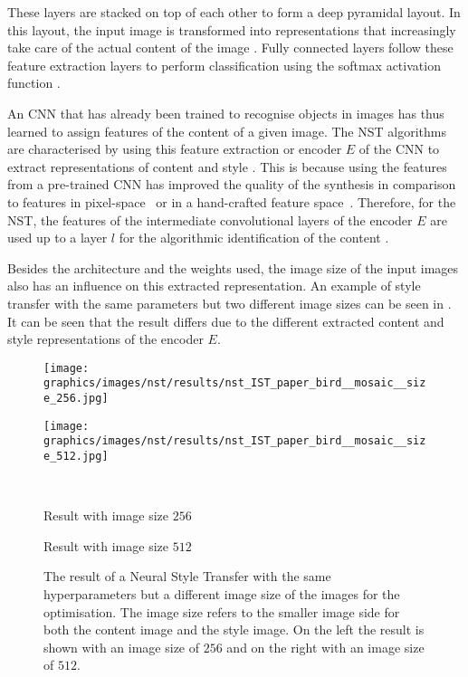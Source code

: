 These layers are stacked on top of each other to form a deep pyramidal layout. In this layout, the input image is transformed into representations that increasingly take care of the actual content of the image \cite{ZF2014}. Fully connected layers follow these feature extraction layers to perform classification using the softmax activation function \cite{Alp2020}. 

An \gls{CNN} that has already been trained to recognise objects in images has thus learned to assign features of the content of a given image. The \gls{NST} algorithms are characterised by using this feature extraction or encoder $E$ of the \gls{CNN} to extract representations of content and style \cite{Glas2021}. This is because using the features from a pre-trained \gls{CNN} has improved the quality of the synthesis in comparison to features in pixel-space~\cite{EL1999} or in a hand-crafted feature space~\cite{PS2000}. Therefore, for the \gls{NST}, the features of the intermediate convolutional layers of the encoder $E$ are used up to a layer $l$ for the algorithmic identification of the content \cite{GEB2016}. 

Besides the architecture and the weights used, the image size of the input images also has an influence on this extracted representation. An example of style transfer with the same parameters but two different image sizes can be seen in . It can be seen that the result differs due to the different extracted content and style representations of the encoder $E$.
\begin{figure}[h]
	\centering
	\begin{minipage}{.5\textwidth}
		\centering
		\texttt{[image: graphics/images/nst/results/nst\_IST\_paper\_bird\_\_mosaic\_\_size\_256.jpg]}
	\end{minipage}%
	\begin{minipage}{.5\textwidth}
		\centering
		\texttt{[image: graphics/images/nst/results/nst\_IST\_paper\_bird\_\_mosaic\_\_size\_512.jpg]}
	\end{minipage}\\ \vspace{0.15cm}
	\begin{minipage}{.5\textwidth}
		\centering
		Result with image size $256$
	\end{minipage}%
	\begin{minipage}{.5\textwidth}
		\centering
		Result with image size $512$
	\end{minipage}
	\caption{The result of a Neural Style Transfer with the same hyperparameters but a different image size of the images for the optimisation. The image size refers to the smaller image side for both the content image and the style image. On the left the result is shown with an image size of $256$ and on the right with an image size of $512$.}
	\label{fig:diff_size_nst}
\end{figure}

